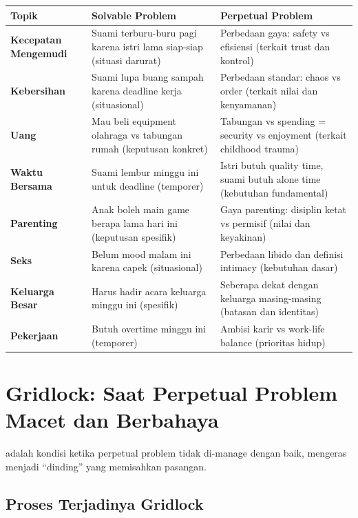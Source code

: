 \begin{center}
\renewcommand{\arraystretch}{1.5}
\begin{tabular}{|>{\raggedright}p{2.5cm}|>{\raggedright}p{5cm}|>{\raggedright\arraybackslash}p{6.5cm}|}
\hline
\rowcolor{secondary!20}
\textbf{Topik} & \textbf{Solvable Problem} & \textbf{Perpetual Problem} \\
\hline
\textbf{Kecepatan Mengemudi} & Suami terburu-buru pagi karena istri lama siap-siap (situasi darurat) & Perbedaan gaya: safety vs efisiensi (terkait trust dan kontrol) \\
\hline
\textbf{Kebersihan} & Suami lupa buang sampah karena deadline kerja (situasional) & Perbedaan standar: chaos vs order (terkait nilai dan kenyamanan) \\
\hline
\textbf{Uang} & Mau beli equipment olahraga vs tabungan rumah (keputusan konkret) & Tabungan vs spending = security vs enjoyment (terkait childhood trauma) \\
\hline
\textbf{Waktu Bersama} & Suami lembur minggu ini untuk deadline (temporer) & Istri butuh quality time, suami butuh alone time (kebutuhan fundamental) \\
\hline
\textbf{Parenting} & Anak boleh main game berapa lama hari ini (keputusan spesifik) & Gaya parenting: disiplin ketat vs permisif (nilai dan keyakinan) \\
\hline
\textbf{Seks} & Belum mood malam ini karena capek (situasional) & Perbedaan libido dan definisi intimacy (kebutuhan dasar) \\
\hline
\textbf{Keluarga Besar} & Harus hadir acara keluarga minggu ini (spesifik) & Seberapa dekat dengan keluarga masing-masing (batasan dan identitas) \\
\hline
\textbf{Pekerjaan} & Butuh overtime minggu ini (temporer) & Ambisi karir vs work-life balance (prioritas hidup) \\
\hline
\end{tabular}
\end{center}

\section{Gridlock: Saat Perpetual Problem Macet dan Berbahaya}

 adalah kondisi ketika perpetual problem tidak di-manage dengan baik, mengeras menjadi ``dinding'' yang memisahkan pasangan.

\subsection{Proses Terjadinya Gridlock}

